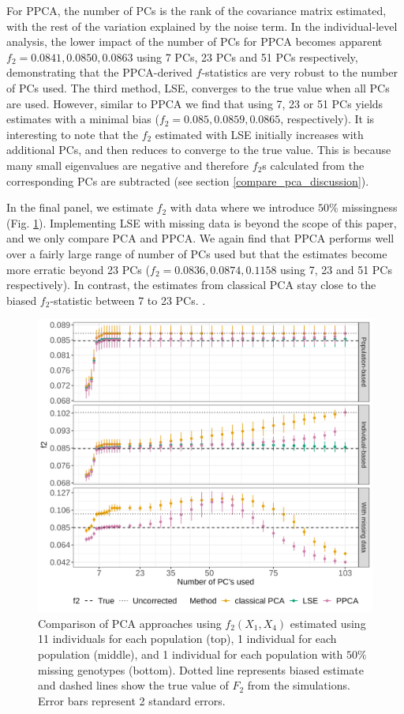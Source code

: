 \documentclass[12pt]{article}
\begin{document}
For PPCA, the number of PCs is the rank of the covariance matrix estimated, with the rest of the variation explained by the noise term. In the individual-level analysis, the lower impact of the number of PCs for PPCA becomes apparent $f_2 = 0.0841, 0.0850, 0.0863$ using 7 PCs, 23 PCs and 51 PCs respectively, demonstrating that the PPCA-derived $f$-statistics are very robust to the number of PCs used. The third method, LSE, converges to the true value when all PCs are used. However, similar to PPCA we find that using 7, 23 or 51 PCs yields estimates with a minimal bias ($f_2 = 0.085, 0.0859, 0.0865$, respectively). It is interesting to note that the $f_2$ estimated with LSE initially increases with additional PCs, and then reduces to converge to the true value. This is because many small eigenvalues are negative and therefore $f_2$s calculated from the corresponding PCs are subtracted (see section \ref{compare_pca_discussion}).

In the final panel, we estimate $f_2$ with data where we introduce $50\%$ missingness (Fig. \ref{fig:comparison}). Implementing LSE with missing data is beyond the scope of this paper, and we only compare PCA and PPCA. We again find that PPCA performs well over a fairly large range of number of PCs used but that the estimates become more erratic beyond 23 PCs ($f_2 = 0.0836, 0.0874, 0.1158$ using 7, 23 and 51 PCs respectively). In contrast, the estimates from classical PCA stay close to the biased $f_2$-statistic between 7 to 23 PCs. .

\begin{figure}[ht!]
    \includegraphics[width=16.5cm]{Images/Figures/mu0.05_main_fig_all_pca.png}
    \centering
    \caption{Comparison of PCA approaches using $f_2(X_1,X_4)$ estimated using 11 individuals for each population (top), 1 individual for each population (middle), and 1 individual for each population with $50\%$ missing genotypes (bottom). Dotted line represents biased estimate and dashed lines show the true value of $F_2$ from the simulations. Error bars represent 2 standard errors.}
    \label{fig:comparison}
\end{figure}
\end{document}
